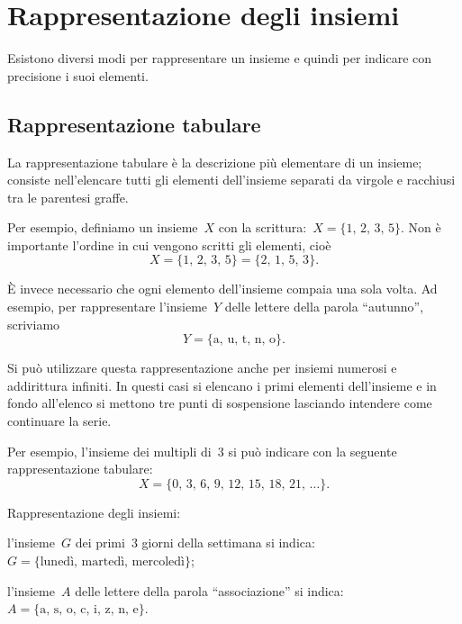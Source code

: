 \chapter{Rappresentazione degli insiemi}

Esistono diversi modi per rappresentare un insieme e quindi per indicare
con precisione i suoi elementi.

\section{Rappresentazione tabulare}

La rappresentazione tabulare è la descrizione più elementare di un
insieme; consiste nell'elencare tutti gli elementi dell'insieme separati da virgole e racchiusi tra le
parentesi graffe.

Per esempio, definiamo un insieme~$X$ con la scrittura:~$X=\{\text{1, 2, 3, 5}\}$.
Non è importante l'ordine in cui vengono scritti gli elementi, cioè
\[X=\{\text{1, 2, 3, 5}\}=\{\text{2, 1, 5, 3}\}.\]

È invece necessario che ogni elemento dell'insieme compaia una sola volta. Ad esempio, per rappresentare
l'insieme~$Y$ delle lettere della parola ``autunno'', scriviamo
\[Y = \{\text{a, u, t, n, o}\}.\]

Si può utilizzare questa rappresentazione anche per insiemi numerosi e addirittura infiniti. In questi casi si elencano i primi elementi
dell'insieme e in fondo all'elenco si mettono tre punti di sospensione lasciando intendere come continuare la serie.

Per esempio, l'insieme dei multipli di~3 si può indicare con la seguente rappresentazione tabulare:
\[X=\{\text{0, 3, 6, 9, 12, 15, 18, 21, }\ldots\}.\]


\begin{exrig}
 \begin{esempio}
Rappresentazione degli insiemi:
 \begin{enumeratea}
\item l'insieme~$G$ dei primi~3 giorni della settimana si indica:~$G=\{\text{lunedì, martedì, mercoledì}\}$;
\item l'insieme~$A$ delle lettere della parola ``associazione'' si indica:~$A=\{\text{a, s, o, c, i, z, n, e}\}$.
\end{enumeratea}
 \end{esempio}
\end{exrig}

\ovalbox{\risolvii \ref{ese:6.1}, \ref{ese:6.2}, \ref{ese:6.3}, \ref{ese:6.4}}

